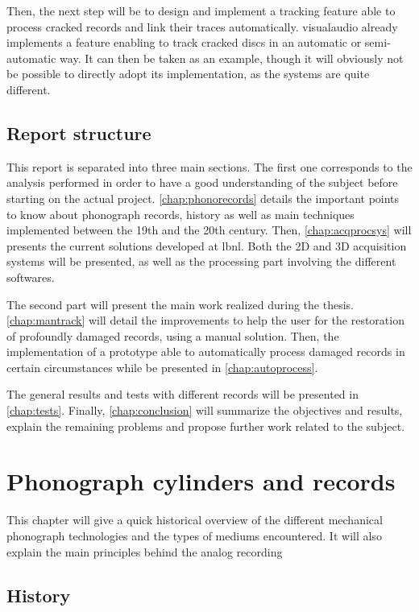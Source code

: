 Then, the next step will be to design and implement a tracking feature able to process cracked records and link their traces automatically. \gls{visualaudio} already implements a feature enabling to track cracked discs in an automatic or semi-automatic way. It can then be taken as an example, though it will obviously not be possible to directly adopt its implementation, as the systems are quite different.

\section{Report structure}

This report is separated into three main sections. The first one corresponds to the analysis performed in order to have a good understanding of the subject before starting on the actual project. \autoref{chap:phonorecords} details the important points to know about phonograph records, history as well as main techniques implemented between the 19th and the 20th century. Then, \ref{chap:acqprocsys} will presents the current solutions developed at \gls{lbnl}. Both the 2D and 3D acquisition systems will be presented, as well as the processing part involving the different softwares.

The second part will present the main work realized during the thesis. \autoref{chap:mantrack} will detail the improvements to help the user for the restoration of profoundly damaged records, using a manual solution. Then, the implementation of a prototype able to automatically process damaged records in certain circumstances while be presented in \autoref{chap:autoprocess}.

The general results and tests with different records will be presented in \autoref{chap:tests}. Finally, \autoref{chap:conclusion} will summarize the objectives and results, explain the remaining problems and propose further work related to the subject.

\chapter{Phonograph cylinders and records}
\label{chap:phonorecords}

This chapter will give a quick historical overview of the different mechanical phonograph technologies and the types of mediums encountered. It will also explain the main principles behind the analog recording

\section{History}

